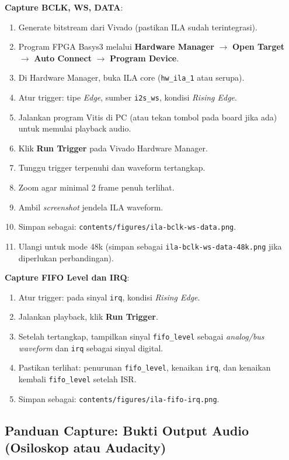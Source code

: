 \textbf{Capture BCLK, WS, DATA}:
\begin{enumerate}
    \item Generate bitstream dari Vivado (pastikan ILA sudah terintegrasi).
    \item Program FPGA Basys3 melalui \textbf{Hardware Manager} $\rightarrow$ \textbf{Open Target} $\rightarrow$ \textbf{Auto Connect} $\rightarrow$ \textbf{Program Device}.
    \item Di Hardware Manager, buka ILA core (\texttt{hw\_ila\_1} atau serupa).
    \item Atur trigger: tipe \textit{Edge}, sumber \texttt{i2s\_ws}, kondisi \textit{Rising Edge}.
    \item Jalankan program Vitis di PC (atau tekan tombol pada board jika ada) untuk memulai playback audio.
    \item Klik \textbf{Run Trigger} pada Vivado Hardware Manager.
    \item Tunggu trigger terpenuhi dan waveform tertangkap.
    \item Zoom agar minimal 2 frame penuh terlihat.
    \item Ambil \textit{screenshot} jendela ILA waveform.
    \item Simpan sebagai: \texttt{contents/figures/ila-bclk-ws-data.png}.
    \item Ulangi untuk mode 48k (simpan sebagai \texttt{ila-bclk-ws-data-48k.png} jika diperlukan perbandingan).
\end{enumerate}

\textbf{Capture FIFO Level dan IRQ}:
\begin{enumerate}
    \item Atur trigger: pada sinyal \texttt{irq}, kondisi \textit{Rising Edge}.
    \item Jalankan playback, klik \textbf{Run Trigger}.
    \item Setelah tertangkap, tampilkan sinyal \texttt{fifo\_level} sebagai \textit{analog/bus waveform} dan \texttt{irq} sebagai sinyal digital.
    \item Pastikan terlihat: penurunan \texttt{fifo\_level}, kenaikan \texttt{irq}, dan kenaikan kembali \texttt{fifo\_level} setelah ISR.
    \item Simpan sebagai: \texttt{contents/figures/ila-fifo-irq.png}.
\end{enumerate}

\subsection{Panduan Capture: Bukti Output Audio (Osiloskop atau Audacity)}


